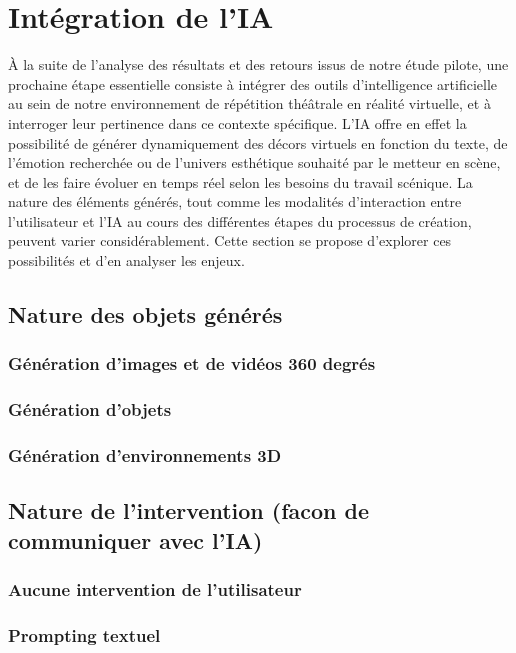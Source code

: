 \section{Intégration de l'IA}
À la suite de l’analyse des résultats et des retours issus de notre étude pilote, une prochaine étape 
essentielle consiste à intégrer des outils d’intelligence artificielle au sein de notre environnement
de répétition théâtrale en réalité virtuelle, et à interroger leur pertinence dans ce contexte spécifique.
L’IA offre en effet la possibilité de générer dynamiquement des décors virtuels en fonction du texte, 
de l’émotion recherchée ou de l’univers esthétique souhaité par le metteur en scène, et de les faire 
évoluer en temps réel selon les besoins du travail scénique. La nature des éléments générés, tout comme
les modalités d’interaction entre l’utilisateur et l’IA au cours des différentes étapes du processus de 
création, peuvent varier considérablement. Cette section se propose d’explorer ces possibilités et d’en 
analyser les enjeux.

\subsection{Nature des objets générés}
\subsubsection{Génération d'images et de vidéos 360 degrés}

\subsubsection{Génération d'objets}

\subsubsection{Génération d'environnements 3D}



\subsection{Nature de l'intervention (facon de communiquer avec l'IA)}
\subsubsection{Aucune intervention de l'utilisateur}
\subsubsection{Prompting textuel}
